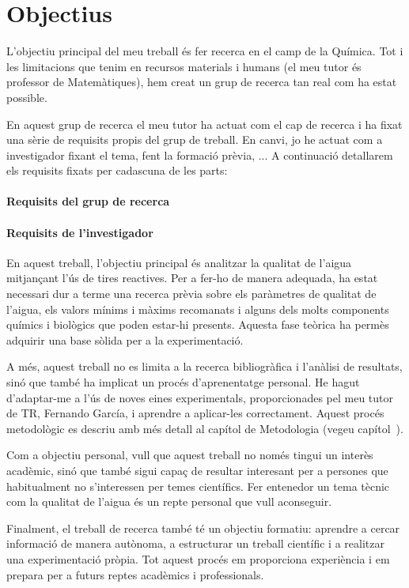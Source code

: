 \chapter{Objectius}

L'objectiu principal del meu treball és fer recerca en el camp de la Química. Tot i les limitacions que tenim en recursos materials i humans (el meu tutor és professor de Matemàtiques), hem creat un grup de recerca tan real com ha estat possible.

En aquest grup de recerca el meu tutor ha actuat com el cap de recerca i ha fixat una sèrie de requisits propis del grup de treball. En canvi, jo he actuat com a investigador fixant el tema, fent la formació prèvia, ...
A continuació detallarem els requisits fixats per cadascuna de les parts:

\subsubsection*{Requisits del grup de recerca}


\subsubsection*{Requisits de l'investigador}


En aquest treball, l’objectiu principal és analitzar la qualitat de l’aigua mitjançant l’ús de tires reactives. Per a fer-ho de manera adequada, ha estat necessari dur a terme una recerca prèvia sobre els paràmetres de qualitat de l’aigua, els valors mínims i màxims recomanats i alguns dels molts components químics i biològics que poden estar-hi presents. Aquesta fase teòrica ha permès adquirir una base sòlida per a la experimentació.

A més, aquest treball no es limita a la recerca bibliogràfica i l’anàlisi de resultats, sinó que també ha implicat un procés d’aprenentatge personal. He hagut d’adaptar-me a l’ús de noves eines experimentals, proporcionades pel meu tutor de TR, Fernando García, i aprendre a aplicar-les correctament. Aquest procés metodològic es descriu amb més detall al capítol de Metodologia (vegeu capítol~).

Com a objectiu personal, vull que aquest treball no només tingui un interès acadèmic, sinó que també sigui capaç de resultar interesant per a persones que habitualment no s’interessen per temes científics. Fer entenedor un tema tècnic com la qualitat de l’aigua és un repte personal que vull aconseguir.

Finalment, el treball de recerca també té un objectiu formatiu: aprendre a cercar informació de manera autònoma, a estructurar un treball científic i a realitzar una experimentació pròpia. Tot aquest procés em proporciona experiència i em prepara per a futurs reptes acadèmics i professionals.

